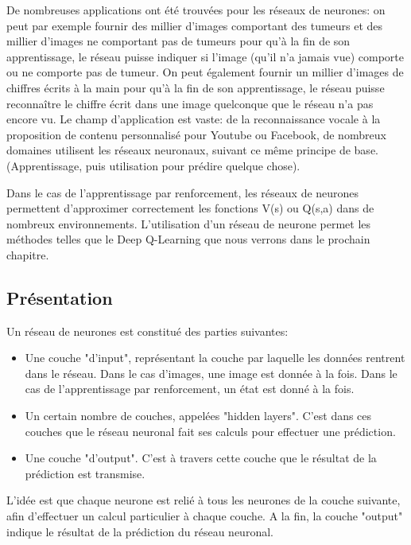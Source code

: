 \documentclass[11pt,a4paper]{report}
\begin{document}
      \par De nombreuses applications ont été trouvées pour les réseaux de neurones: on peut par exemple fournir des millier d'images comportant des tumeurs et des millier d'images ne comportant pas de tumeurs pour qu'à la fin de son apprentissage, le réseau puisse indiquer si l'image (qu'il n'a jamais vue) comporte ou ne comporte pas de tumeur. On peut également fournir un millier d'images de chiffres écrits à la main pour qu'à la fin de son apprentissage, le réseau puisse reconnaître le chiffre écrit dans une image quelconque que le réseau n'a pas encore vu. Le champ d'application est vaste: de la reconnaissance vocale à la proposition de contenu personnalisé pour Youtube ou Facebook, de nombreux domaines utilisent les réseaux neuronaux, suivant ce même principe de base. (Apprentissage, puis utilisation pour prédire quelque chose). 
      
      \par Dans le cas de l'apprentissage par renforcement, les réseaux de neurones permettent d'approximer correctement les fonctions V(s) ou Q(s,a) dans de nombreux environnements. L'utilisation d'un réseau de neurone permet les méthodes telles que le Deep Q-Learning que nous verrons dans le prochain chapitre. 
      
  \subsection{Présentation}
  
    \par Un réseau de neurones est constitué des parties suivantes: 

    \renewcommand{\labelitemi}{\textbullet}
    \begin{itemize}
    \item Une couche "d'input", représentant la couche par laquelle les données rentrent dans le réseau. Dans le cas d'images, une image est donnée à la fois. Dans le cas de l'apprentissage par renforcement, un état est donné à la fois. 
    \item Un certain nombre de couches, appelées "hidden layers". C'est dans ces couches que le réseau neuronal fait ses calculs pour effectuer une prédiction. 
    \item Une couche "d'output". C'est à travers cette couche que le résultat de la prédiction est transmise. 
    \end{itemize}    
    
    \par L'idée est que chaque neurone est relié à tous les neurones de la couche suivante, afin d'effectuer un calcul particulier à chaque couche. A la fin, la couche "output" indique le résultat de la prédiction du réseau neuronal. 
    
\end{document}
